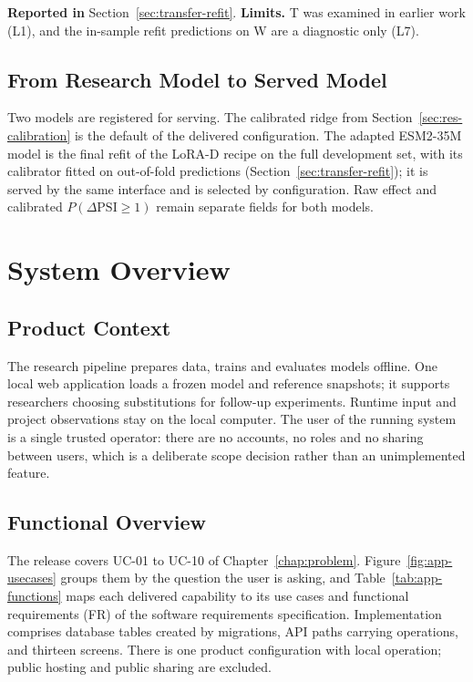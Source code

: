 \textbf{Reported in} Section~\ref{sec:transfer-refit}. \textbf{Limits.} T was examined in earlier work
(L1), and the in-sample refit predictions on W are a diagnostic only (L7).



\subsection{From Research Model to Served Model}
Two models are registered for serving. The calibrated ridge \nAppModelId{} from
Section~\ref{sec:res-calibration} is the default of the delivered configuration. The adapted
ESM2-35M model \nAppLoraId{} is the final refit of the LoRA-D recipe on the full development set,
with its calibrator fitted on out-of-fold predictions (Section~\ref{sec:transfer-refit}); it is
served by the same interface and is selected by configuration. Raw effect and calibrated
$P(\Delta\mathrm{PSI}\geq1)$ remain separate fields for both models.



\section{System Overview}
\subsection{Product Context}
The research pipeline prepares data, trains and evaluates models offline. One local web application
loads a frozen model and reference snapshots; it supports researchers choosing substitutions for
follow-up experiments. Runtime input and project observations stay on the local computer. The user
of the running system is a single trusted operator: there are no accounts, no roles and no sharing
between users, which is a deliberate scope decision rather than an unimplemented feature.

\subsection{Functional Overview}
The release covers UC-01 to UC-10 of Chapter~\ref{chap:problem}. Figure~\ref{fig:app-usecases}
groups them by the question the user is asking, and Table~\ref{tab:app-functions} maps each delivered
capability to its use cases and functional requirements (FR) of the software requirements
specification. Implementation comprises \nAppTables{} database tables created by
\nAppMigrations{} migrations, \nAppPaths{} API paths carrying \nAppOperations{} operations, and
thirteen screens. There is one product configuration with local operation; public hosting and public
sharing are excluded.

